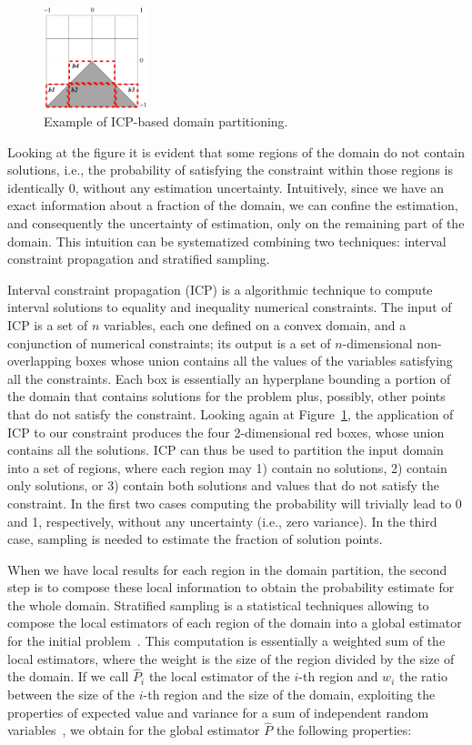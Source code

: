 \begin{figure}[h!]\label{fig:stratifiedICP}
  \centering
      \includegraphics[width=3cm]{triangle}
  \caption{Example of ICP-based domain partitioning.}
\end{figure}

Looking at the figure it is evident that some regions of the domain do not contain solutions, i.e., the probability of satisfying the constraint within those regions is identically 0, without any estimation uncertainty. Intuitively, since we have an exact information about a fraction of the domain, we can confine the estimation, and consequently the uncertainty of estimation, only on the remaining part of the domain. This intuition can be systematized combining two techniques: interval constraint propagation and stratified sampling. 

Interval constraint propagation (ICP) is a algorithmic technique to compute interval solutions to equality and inequality numerical constraints. The input of ICP is a set of $n$ variables, each one defined on a convex domain, and a conjunction of numerical constraints; its output is a set of $n$-dimensional non-overlapping boxes whose union contains all the values of the variables satisfying all the constraints. Each box is essentially an hyperplane bounding a portion of the domain that contains solutions for the problem plus, possibly, other points that do not satisfy the constraint. Looking again at Figure~\ref{fig:stratifiedICP}, the application of ICP to our constraint produces the four 2-dimensional red boxes, whose union contains all the solutions. ICP can thus be used to partition the input domain into a set of regions, where each region may 1) contain no solutions, 2) contain only solutions, or 3) contain both solutions and values that do not satisfy the constraint. In the first two cases computing the probability will trivially lead to 0 and 1, respectively, without any uncertainty (i.e., zero variance). In the third case, sampling is needed to estimate the fraction of solution points.

When we have local results for each region in the domain partition, the second step is to compose these local information to obtain the probability estimate for the whole domain. Stratified sampling is a statistical techniques allowing to compose the local estimators of each region of the domain into a global estimator for the initial problem~\cite{Robert2005MCBook}. This computation is essentially a weighted sum of the local estimators, where the weight is the size of the region divided by the size of the domain. If we call $\hat{P}_i$ the local estimator of the $i$-th region and $w_i$ the ratio between the size of the $i$-th region and the size of the domain, exploiting the properties of expected value and variance for a sum of independent random variables~\cite{pestman1998mathematical}, we obtain for the global estimator $\hat{P}$ the following properties:

